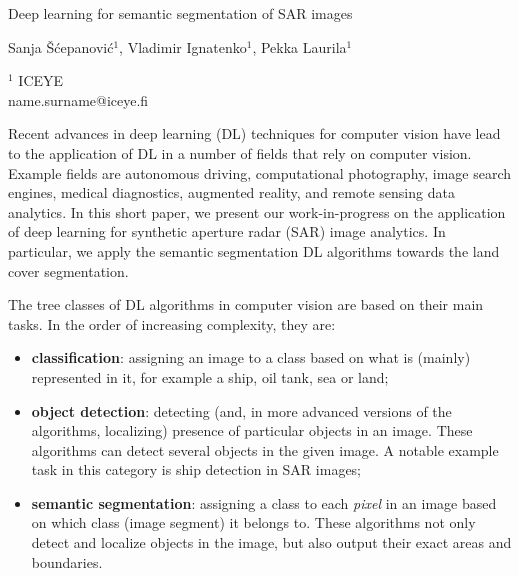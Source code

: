 \documentclass[a4paper]{article}
\begin{document}

\Large
 \begin{center}
Deep learning for semantic segmentation of SAR images\\ 

\hspace{10pt}

\large
Sanja \v{S}\'{c}epanovi\'{c}$^1$, Vladimir Ignatenko$^1$, Pekka Laurila$^1$ \\

\hspace{10pt}

\small  
$^1$ ICEYE\\
name.surname@iceye.fi

\end{center}

\hspace{10pt}

\normalsize
Recent advances in deep learning (DL) techniques for computer vision have lead to the application of DL in a number of fields that rely on computer vision. Example fields are autonomous driving, computational photography, image search engines, medical diagnostics, augmented reality, and remote sensing data analytics. In this short paper, we present our work-in-progress on the application of deep learning for synthetic aperture radar (SAR) image analytics. In particular, we apply the semantic segmentation DL algorithms towards the land cover segmentation. %


The tree classes of DL algorithms in computer vision are based on their main tasks. In the order of increasing complexity, they are:
\begin{itemize}
\itemsep0em 
\item \textbf{classification}: assigning an image to a class based on what is (mainly) represented in it, for example a ship, oil tank, sea or land;
\item \textbf{object detection}: detecting (and, in more advanced versions of the algorithms, localizing) presence of particular objects in an image. These algorithms can detect several objects in the given image. A notable example task in this category is ship detection in SAR images;
\item \textbf{semantic segmentation}: assigning a class to each \textit{pixel} in an image based on which class (image segment) it belongs to. These algorithms not only detect and localize objects in the image, but also output their exact areas and boundaries.
\end{itemize}
\end{document}
